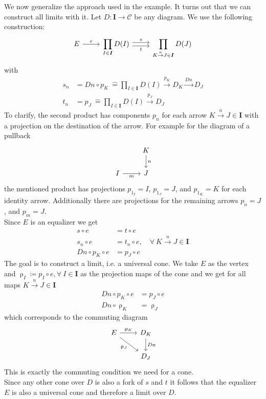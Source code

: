 We now generalize
the approach used in the example. It turns out that we can construct all
limits with it.
Let $D : \bm I \to \mathscr C$ be any diagram.
We use the following construction:
\[
  \begin{tikzcd}
    E \arrow{r}{e} &
    \displaystyle \prod_{I \in \bm{I}} D(I)
    \arrow[r,shift left, "s"] \arrow[r,shift right,swap,"t"] &
    \displaystyle \prod_{K \overset{n}{\to} J \in \bm{I}} D(J)
  \end{tikzcd}
\]
with
\begin{align*}
  s_n &= Dn \circ p_K\ \hat{=} \prod_{I \in \bm{I}} D(I)
        \overset{p_K}{\rightarrow} D_K \overset{Dn}{\rightarrow} D_J \\
  t_n &= p_J\ \hat{=} \prod_{I \in \bm{I}} D(I)
        \overset{p_J}{\rightarrow} D_J
\end{align*}
To clarify, the second product has components $p_n$ for each arrow
$K \overset{n}{\to} J \in \bm{I}$ with a projection on
the destination of the arrow.
For example for the diagram of a pullback
\[
  \begin{tikzcd}
    & K \arrow{d}{n} \\
    I \arrow[swap]{r}{m} & J
  \end{tikzcd}
\]
the mentioned product has projections $p_{1_I} = I$, $p_{1_J} = J$, and $p_{1_K} = K$
for each identity arrow.
Additionally there are projections for the remaining arrows $p_n = J$, and $p_m = J$.\\
Since $E$ is an equalizer we get
\begin{align*}
  s \circ e &= t \circ e\\
  s_n \circ e &= t_n \circ e, \quad \forall\ K \overset{n}{\rightarrow} J \in \bm I \\
  Dn \circ p_K \circ e &= p_J \circ e
\end{align*}
The goal is to construct a limit, i.e. a universal cone.
We take $E$ as the vertex and
$\uprho_I \coloneqq p_I \circ e, \forall\ I \in \bm I$
as the projection maps of the cone and we get
for all maps $K \overset{n}{\rightarrow} J \in \bm I$
\begin{align*}
  Dn \circ p_K \circ e &= p_J \circ e \\
  Dn \circ \uprho_K &= \uprho_J
\end{align*}
which corresponds to the commuting diagram
\[
  \begin{tikzcd}
    E \arrow{r}{\uprho_K} \arrow{dr}[swap]{\uprho_J} & D_K \arrow{d}{Dn}\\
    & D_J
  \end{tikzcd}
\]
This is exactly the commuting condition we need for a cone.\\
Since any other cone over $D$
is also a fork of $s$ and $t$
it follows that the equalizer $E$ is also a universal cone
and therefore a limit over $D$.

